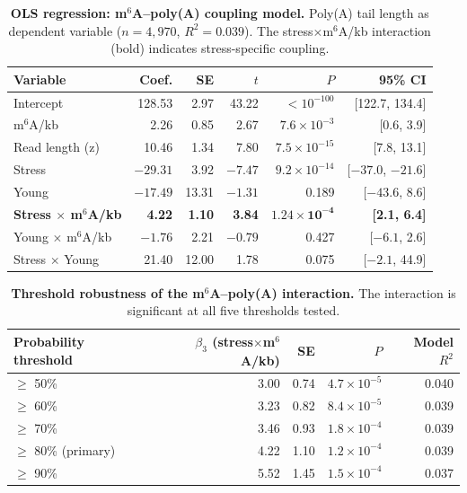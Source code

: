 \documentclass[11pt]{article}
\newcommand{\msix}{m$^6$A}
\begin{document}
\begin{table}[htbp]
\centering
\caption{\textbf{OLS regression: \msix{}--poly(A) coupling model.} Poly(A) tail length as dependent variable ($n = 4{,}970$, $R^2 = 0.039$). The stress$\times$\msix{}/kb interaction (bold) indicates stress-specific coupling.}
\label{tab:s2}
\begin{tabular}{lrrrrr}
\toprule
Variable & Coef. & SE & $t$ & $P$ & 95\% CI \\
\midrule
Intercept            & 128.53 &  2.97 & 43.22 & $<10^{-100}$ & [122.7, 134.4] \\
\msix{}/kb           &   2.26 &  0.85 &  2.67 & $7.6\times10^{-3}$   & [0.6, 3.9] \\
Read length (z)      &  10.46 &  1.34 &  7.80 & $7.5\times10^{-15}$ & [7.8, 13.1] \\
Stress               & $-29.31$ &  3.92 & $-7.47$ & $9.2\times10^{-14}$ & [$-37.0$, $-21.6$] \\
Young                & $-17.49$ & 13.31 & $-1.31$ & 0.189   & [$-43.6$, 8.6] \\
\textbf{Stress $\times$ \msix{}/kb} & \textbf{4.22} & \textbf{1.10} & \textbf{3.84} & $\mathbf{1.24\times10^{-4}}$ & \textbf{[2.1, 6.4]} \\
Young $\times$ \msix{}/kb & $-1.76$ &  2.21 &  $-0.79$ & 0.427   & [$-6.1$, 2.6] \\
Stress $\times$ Young & 21.40 & 12.00 &  1.78 & 0.075   & [$-2.1$, 44.9] \\
\bottomrule
\end{tabular}
\end{table}

\begin{table}[htbp]
\centering
\caption{\textbf{Threshold robustness of the \msix{}--poly(A) interaction.} The interaction is significant at all five thresholds tested.}
\label{tab:s3}
\begin{tabular}{lrrrr}
\toprule
Probability threshold & $\beta_3$ (stress$\times$\msix{}/kb) & SE & $P$ & Model $R^2$ \\
\midrule
$\geq$ 50\% & 3.00 & 0.74 & $4.7\times10^{-5}$ & 0.040 \\
$\geq$ 60\% & 3.23 & 0.82 & $8.4\times10^{-5}$ & 0.039 \\
$\geq$ 70\% & 3.46 & 0.93 & $1.8\times10^{-4}$ & 0.039 \\
$\geq$ 80\% (primary) & 4.22 & 1.10 & $1.2\times10^{-4}$ & 0.039 \\
$\geq$ 90\% & 5.52 & 1.45 & $1.5\times10^{-4}$ & 0.037 \\
\bottomrule
\end{tabular}
\end{table}
\end{document}
